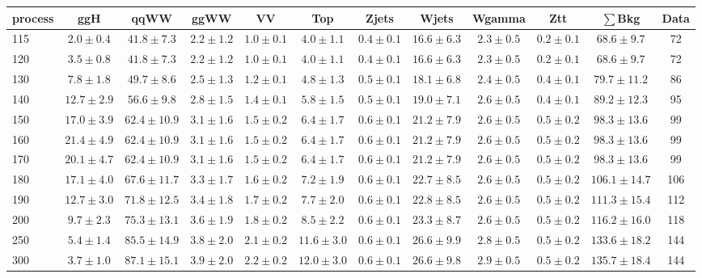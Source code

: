 \begin{table}
{\footnotesize
 \begin{center}
 \begin{tabular}{l c c c c c c c c c c c }
 \hline
 process & ggH & qqWW & ggWW & VV & Top & Zjets & Wjets & Wgamma & Ztt & $\sum$Bkg & Data \\
 \hline
115 & $2.0\pm0.4$ & $41.8\pm7.3$ & $2.2\pm1.2$ & $1.0\pm0.1$ & $4.0\pm1.1$ & $0.4\pm0.1$ & $16.6\pm6.3$ & $2.3\pm0.5$ & $0.2\pm0.1$ & $68.6\pm9.7$ & 72 \\
120 & $3.5\pm0.8$ & $41.8\pm7.3$ & $2.2\pm1.2$ & $1.0\pm0.1$ & $4.0\pm1.1$ & $0.4\pm0.1$ & $16.6\pm6.3$ & $2.3\pm0.5$ & $0.2\pm0.1$ & $68.6\pm9.7$ & 72 \\
130 & $7.8\pm1.8$ & $49.7\pm8.6$ & $2.5\pm1.3$ & $1.2\pm0.1$ & $4.8\pm1.3$ & $0.5\pm0.1$ & $18.1\pm6.8$ & $2.4\pm0.5$ & $0.4\pm0.1$ & $79.7\pm11.2$ & 86 \\
140 & $12.7\pm2.9$ & $56.6\pm9.8$ & $2.8\pm1.5$ & $1.4\pm0.1$ & $5.8\pm1.5$ & $0.5\pm0.1$ & $19.0\pm7.1$ & $2.6\pm0.5$ & $0.4\pm0.1$ & $89.2\pm12.3$ & 95 \\
150 & $17.0\pm3.9$ & $62.4\pm10.9$ & $3.1\pm1.6$ & $1.5\pm0.2$ & $6.4\pm1.7$ & $0.6\pm0.1$ & $21.2\pm7.9$ & $2.6\pm0.5$ & $0.5\pm0.2$ & $98.3\pm13.6$ & 99 \\
160 & $21.4\pm4.9$ & $62.4\pm10.9$ & $3.1\pm1.6$ & $1.5\pm0.2$ & $6.4\pm1.7$ & $0.6\pm0.1$ & $21.2\pm7.9$ & $2.6\pm0.5$ & $0.5\pm0.2$ & $98.3\pm13.6$ & 99 \\
170 & $20.1\pm4.7$ & $62.4\pm10.9$ & $3.1\pm1.6$ & $1.5\pm0.2$ & $6.4\pm1.7$ & $0.6\pm0.1$ & $21.2\pm7.9$ & $2.6\pm0.5$ & $0.5\pm0.2$ & $98.3\pm13.6$ & 99 \\
180 & $17.1\pm4.0$ & $67.6\pm11.7$ & $3.3\pm1.7$ & $1.6\pm0.2$ & $7.2\pm1.9$ & $0.6\pm0.1$ & $22.7\pm8.5$ & $2.6\pm0.5$ & $0.5\pm0.2$ & $106.1\pm14.7$ & 106 \\
190 & $12.7\pm3.0$ & $71.8\pm12.5$ & $3.4\pm1.8$ & $1.7\pm0.2$ & $7.7\pm2.0$ & $0.6\pm0.1$ & $22.8\pm8.5$ & $2.6\pm0.5$ & $0.5\pm0.2$ & $111.3\pm15.4$ & 112 \\
200 & $9.7\pm2.3$ & $75.3\pm13.1$ & $3.6\pm1.9$ & $1.8\pm0.2$ & $8.5\pm2.2$ & $0.6\pm0.1$ & $23.3\pm8.7$ & $2.6\pm0.5$ & $0.5\pm0.2$ & $116.2\pm16.0$ & 118 \\
250 & $5.4\pm1.4$ & $85.5\pm14.9$ & $3.8\pm2.0$ & $2.1\pm0.2$ & $11.6\pm3.0$ & $0.6\pm0.1$ & $26.6\pm9.9$ & $2.8\pm0.5$ & $0.5\pm0.2$ & $133.6\pm18.2$ & 144 \\
300 & $3.7\pm1.0$ & $87.1\pm15.1$ & $3.9\pm2.0$ & $2.2\pm0.2$ & $12.0\pm3.0$ & $0.6\pm0.1$ & $26.6\pm9.8$ & $2.9\pm0.5$ & $0.5\pm0.2$ & $135.7\pm18.4$ & 144 \\

\end{tabular}
\end{center}}
\end{table}

